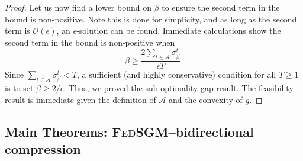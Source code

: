 \documentclass{article} %
\def\A{{\mathcal A}}
\begin{document}
\begin{proof}
Let us now find a lower bound on $\beta$ to ensure the second term in the bound is non-positive. Note this is done for simplicity, and as long as the second term is $\mathcal{O}(\epsilon)$, an $\epsilon$-solution can be found. Immediate calculations show  the second term in the bound is non-positive when
\begin{equation*}
    \beta \geq \frac{2\sum_{t\in \A} \sigma_\beta^t}{\epsilon T}.
\end{equation*}
Since $\sum_{t\in \A} \sigma_\beta^t <T$, a sufficient (and highly conservative) condition for all $T\geq 1$ is to set $\beta \geq 2/\epsilon$. 
Thus, we proved the sub-optimality gap result. The feasibility result is immediate given the definition of $\A$ and the convexity of $g$.
\end{proof}
\subsection{Main Theorems: \textsc{FedSGM}--bidirectional compression}
\end{document}
